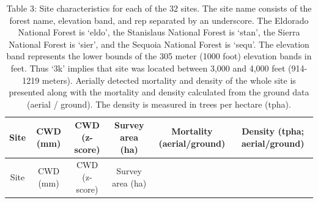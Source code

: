 \documentclass[]{article}
\begin{document}
\begin{longtable}[]{@{}cccccc@{}}
\caption{Table 3: Site characteristics for each of the 32 sites. The
site name consists of the forest name, elevation band, and rep separated
by an underscore. The Eldorado National Forest is `eldo', the Stanislaus
National Forest is `stan', the Sierra National Forest is `sier', and the
Sequoia National Forest is `sequ'. The elevation band represents the
lower bounds of the 305 meter (1000 foot) elevation bands in feet. Thus
`3k' implies that site was located between 3,000 and 4,000 feet
(914-1219 meters). Aerially detected mortality and density of the whole
site is presented along with the mortality and density calculated from
the ground data (aerial / ground). The density is measured in trees per
hectare (tpha).}\tabularnewline
\toprule
\begin{minipage}[b]{0.12\columnwidth}\centering\strut
Site\strut
\end{minipage} & \begin{minipage}[b]{0.07\columnwidth}\centering\strut
CWD (mm)\strut
\end{minipage} & \begin{minipage}[b]{0.12\columnwidth}\centering\strut
CWD (z-score)\strut
\end{minipage} & \begin{minipage}[b]{0.14\columnwidth}\centering\strut
Survey area (ha)\strut
\end{minipage} & \begin{minipage}[b]{0.17\columnwidth}\centering\strut
Mortality (aerial/ground)\strut
\end{minipage} & \begin{minipage}[b]{0.22\columnwidth}\centering\strut
Density (tpha; aerial/ground)\strut
\end{minipage}\tabularnewline
\midrule
\endfirsthead
\toprule
\begin{minipage}[b]{0.12\columnwidth}\centering\strut
Site\strut
\end{minipage} & \begin{minipage}[b]{0.07\columnwidth}\centering\strut
CWD (mm)\strut
\end{minipage} & \begin{minipage}[b]{0.12\columnwidth}\centering\strut
CWD (z-score)\strut
\end{minipage} & \begin{minipage}[b]{0.14\columnwidth}\centering\strut
Survey area (ha)\strut
\end{minipage} & \begin{minipage}[b]{0.17\columnwidth}\centering\strut

\end{minipage}
\end{longtable}
\end{document}
